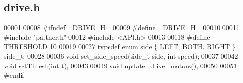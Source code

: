 \subsection{drive.\+h}
\label{a00014_source}

\begin{DoxyCode}
00001 
00008 \textcolor{preprocessor}{#ifndef \_DRIVE\_H\_}
00009 \textcolor{preprocessor}{#define \_DRIVE\_H\_}
00010 
00011 \textcolor{preprocessor}{#include "partner.h"}
00012 \textcolor{preprocessor}{#include <API.h>}
00013 
00018 \textcolor{preprocessor}{#define THRESHOLD 10}
00019 
00027 \textcolor{keyword}{typedef} \textcolor{keyword}{enum} side \{ LEFT, BOTH, RIGHT \} side_t;
00028 
00036 \textcolor{keywordtype}{void} set_side_speed(side_t side, \textcolor{keywordtype}{int} speed);
00037 
00042 \textcolor{keywordtype}{void} setThresh(\textcolor{keywordtype}{int} t);
00043 
00049 \textcolor{keywordtype}{void} update_drive_motors();
00050 
00051 \textcolor{preprocessor}{#endif}
\end{DoxyCode}
